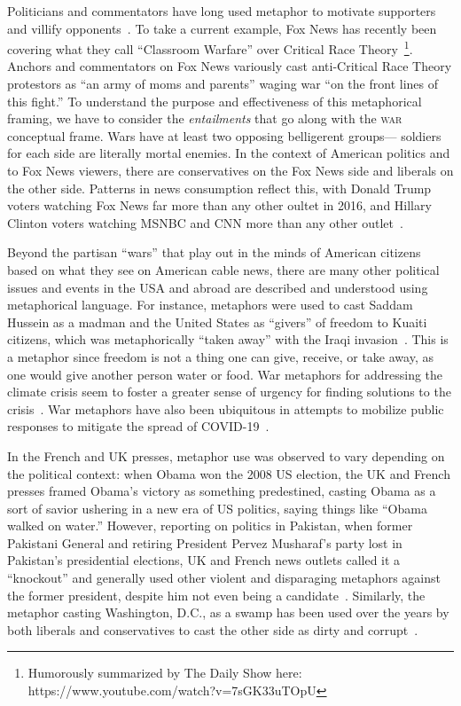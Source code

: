 Politicians and commentators have long used metaphor to motivate
supporters and villify opponents~\cite{Charteris-Black2009}. 
To take a current example, Fox News has
recently been covering what they call ``Classroom Warfare'' over
Critical Race Theory~\footnote{Humorously summarized by The Daily Show here: \\
https://www.youtube.com/watch?v=7sGK33uTOpU}.
Anchors and commentators on Fox News variously cast anti-Critical Race Theory
protestors as ``an army of moms and parents'' waging war ``on the front lines
of this fight.'' To understand the purpose and effectiveness of this metaphorical framing, 
we have to consider the \emph{entailments} that go
along with the \textsc{war} conceptual frame. Wars have at least two opposing
belligerent groups---
soldiers for each side are literally mortal enemies. 
In the context of American politics and to Fox News viewers, there
are conservatives on the Fox News side and liberals on the other side. 
Patterns in news consumption reflect this, with Donald Trump
voters watching Fox News far more than any other oultet in 2016, and 
Hillary Clinton voters watching MSNBC and CNN more than any other 
outlet~\cite{Prior2013,Pew2014PolarizationAndMediaHabits,Pew2017TrumpClinton}.

Beyond the partisan ``wars'' that play out in the minds of American citizens
based on what they see on American cable news, there are many
other political issues and events in the USA and abroad are 
described and understood using metaphorical language. For instance, metaphors were
used to cast Saddam Hussein as a madman and the United States as ``givers''
of freedom to Kuaiti citizens, which was metaphorically ``taken away''
with the Iraqi invasion~\cite{Lakoff1991}. 
This is a metaphor since freedom
is not a thing one can give, receive, or take away, 
as one would give another person water or food.
War metaphors for addressing the climate crisis seem to foster a greater
sense of urgency for finding solutions to the crisis~\cite{Flusberg2018}. 
War metaphors have also been ubiquitous in attempts to mobilize public 
responses to mitigate the spread of COVID-19~\cite{CastroSeixas2021}.

In the French and UK presses, metaphor use was observed to vary depending on the
political context: when Obama won the 2008 US election,
the UK and French presses framed Obama's victory as something predestined,
casting Obama as a sort of savior ushering in a new era of US politics, 
saying things like ``Obama walked on water.'' However, reporting on politics in Pakistan,
when former Pakistani General and retiring President Pervez Musharaf's party 
lost in Pakistan's presidential elections, UK and French news outlets 
called it a ``knockout'' and generally used other violent and disparaging
metaphors against the former president, despite him not even being a 
candidate~\cite{Burnes2011}. Similarly, the metaphor casting Washington, D.C.,
as a swamp has been used over the years
by both liberals and conservatives to cast the other side 
as dirty and corrupt~\cite{Burgers2019}.

